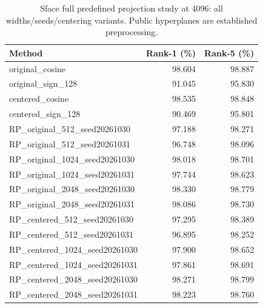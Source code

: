 \begin{table}[t]
\caption{Sface full predefined projection study at 4096: all widths/seeds/centering variants. Public hyperplanes are established preprocessing.}
\label{tab:v3allsface}\centering\small
\setlength{\tabcolsep}{3pt}
\begin{tabular}{lrr}
\toprule
Method & Rank-1 (\%) & Rank-5 (\%) \\
\midrule
original\_cosine & 98.604 & 98.887 \\
original\_sign\_128 & 91.045 & 95.830 \\
centered\_cosine & 98.535 & 98.848 \\
centered\_sign\_128 & 90.469 & 95.801 \\
RP\_original\_512\_seed20261030 & 97.188 & 98.271 \\
RP\_original\_512\_seed20261031 & 96.748 & 98.096 \\
RP\_original\_1024\_seed20261030 & 98.018 & 98.701 \\
RP\_original\_1024\_seed20261031 & 97.744 & 98.623 \\
RP\_original\_2048\_seed20261030 & 98.330 & 98.779 \\
RP\_original\_2048\_seed20261031 & 98.086 & 98.730 \\
RP\_centered\_512\_seed20261030 & 97.295 & 98.389 \\
RP\_centered\_512\_seed20261031 & 96.895 & 98.252 \\
RP\_centered\_1024\_seed20261030 & 97.900 & 98.652 \\
RP\_centered\_1024\_seed20261031 & 97.861 & 98.691 \\
RP\_centered\_2048\_seed20261030 & 98.271 & 98.799 \\
RP\_centered\_2048\_seed20261031 & 98.223 & 98.760 \\
\bottomrule
\end{tabular}
\end{table}


